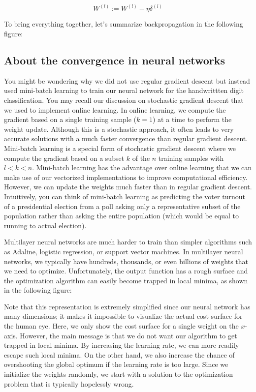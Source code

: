 \documentclass[11pt]{article}
\begin{document}
\[W^{(l)} := W^{(l)} - \eta \delta^{(l)}\]

To bring everything together, let's summarize backpropagation in the
following figure:

    \subsection{About the convergence in neural
networks}\label{about-the-convergence-in-neural-networks}

    You might be wondering why we did not use regular gradient descent but
instead used mini-batch learning to train our neural network for the
handwrittten digit classification. You may recall our discussion on
stochastic gradient descent that we used to implement online learning.
In online learning, we compute the gradient based on a single training
sample (\(k=1\)) at a time to perform the weight update. Although this
is a stochastic approach, it often leads to very accurate solutions with
a much faster convergence than regular gradient descent. Mini-batch
learning is a special form of stochastic gradient descent where we
compute the gradient based on a subset \(k\) of the \(n\) training
samples with \(l < k < n\). Mini-batch learning has the advantage over
online learning that we can make use of our vectorized implementations
to improve computational efficiency. However, we can update the weights
much faster than in regular gradient descent. Intuitively, you can think
of mini-batch learning as predicting the voter turnout of a presidential
election from a poll asking only a representative subset of the
population rather than asking the entire population (which would be
equal to running to actual election).

Multilayer neural networks are much harder to train than simpler
algorithms such as Adaline, logistic regression, or support vector
machines. In multilayer neural networks, we typically have hundreds,
thousands, or even billions of weights that we need to optimize.
Unfortunately, the output function has a rough surface and the
optimization algorithm can easily become trapped in local minima, as
shown in the following figure:

    Note that this representation is extremely simplified since our neural
network has many dimensions; it makes it impossible to visualize the
actual cost surface for the human eye. Here, we only show the cost
surface for a single weight on the \(x\)-axis. However, the main message
is that we do not want our algorithm to get trapped in local minima. By
increasing the learning rate, we can more readily escape such local
minima. On the other hand, we also increase the chance of overshooting
the global optimum if the learning rate is too large. Since we
initialize the weights randomly, we start with a solution to the
optimization problem that is typically hopelessly wrong.
\end{document}
